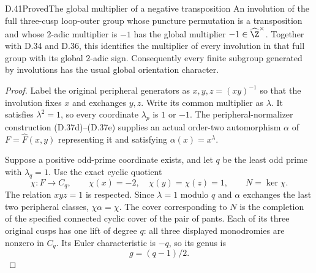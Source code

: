 \begin{claim}{D.41}{Proved}{The global multiplier of a negative transposition}
An involution of the full three-cusp loop-outer group whose
puncture permutation is a transposition and whose $2$-adic
multiplier is $-1$ has the global multiplier
$-1\in\widehat\Z^\times$.
Together with D.34 and D.36, this identifies the multiplier
of every involution in that full group with its global
$2$-adic sign.  Consequently every finite subgroup generated
by involutions has the usual global orientation character.
\end{claim}
\begin{proof}
Label the original peripheral generators as
$x,y,z=(xy)^{-1}$ so that the involution fixes $x$ and
exchanges $y,z$.  Write its common multiplier as $\lambda$.
It satisfies $\lambda^2=1$, so every coordinate $\lambda_p$
is $1$ or $-1$.  The peripheral-normalizer construction
(D.37d)--(D.37e) supplies an actual order-two automorphism
$\alpha$ of $F=\widehat F(x,y)$ representing it and satisfying
$\alpha(x)=x^\lambda$.

Suppose a positive odd-prime coordinate exists, and let
$q$ be the least odd prime with $\lambda_q=1$.  Use the
exact cyclic quotient
\[
 \chi:F\longrightarrow C_q,\qquad
       \chi(x)=-2,\quad\chi(y)=\chi(z)=1,\qquad N=\ker\chi .
                                                        \tag{D.41a}
\]
The relation $xyz=1$ is respected.  Since $\lambda=1$
modulo $q$ and $\alpha$ exchanges the last two peripheral
classes, $\chi\alpha=\chi$.  The cover corresponding to
$N$ is the completion of the specified connected cyclic
cover of the pair of pants.  Each of its three original
cusps has one lift of degree $q$: all three displayed
monodromies are nonzero in $C_q$.  Its Euler characteristic
is $-q$, so its genus is
\[
                             g=(q-1)/2.
                                                        \tag{D.41b}
\]


\end{proof}
